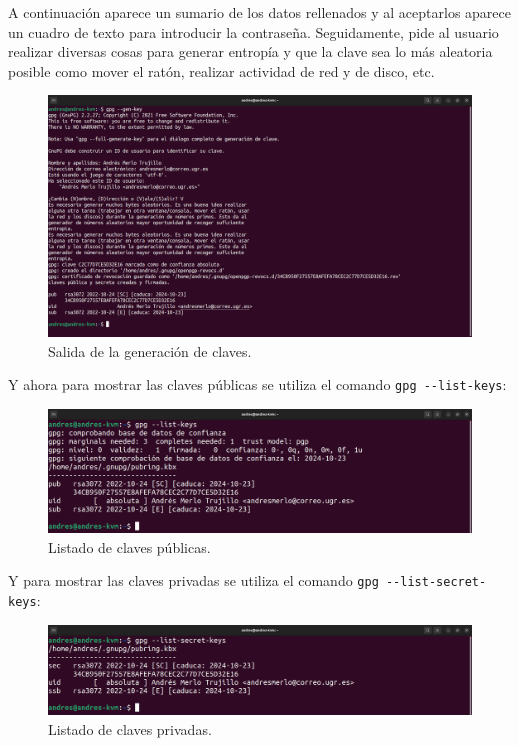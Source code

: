 \documentclass{article}
\begin{document}
A continuación aparece un sumario de los datos rellenados y al aceptarlos aparece un cuadro de texto para introducir la contraseña. Seguidamente, pide al usuario realizar diversas cosas para generar entropía y que la clave sea lo más aleatoria posible como mover el ratón, realizar actividad de red y de disco, etc.

\begin{figure}[H]
    \includegraphics[width=\textwidth]{imagenes/Portatil/Captura desde 2022-10-24 11-46-02.png}
    \caption{Salida de la generación de claves.}
\end{figure}

\newpage

Y ahora para mostrar las claves públicas se utiliza el comando \verb|gpg --list-keys|:

\begin{figure}[H]
    \includegraphics[width=\textwidth]{imagenes/Portatil/Captura desde 2022-10-24 11-46-16.png}
    \caption{Listado de claves públicas.}
\end{figure}

Y para mostrar las claves privadas se utiliza el comando \verb|gpg --list-secret-keys|:

\begin{figure}[H]
    \includegraphics[width=\textwidth]{imagenes/Portatil/Captura desde 2022-10-24 11-46-25.png}
    \caption{Listado de claves privadas.}
\end{figure}
\end{document}
